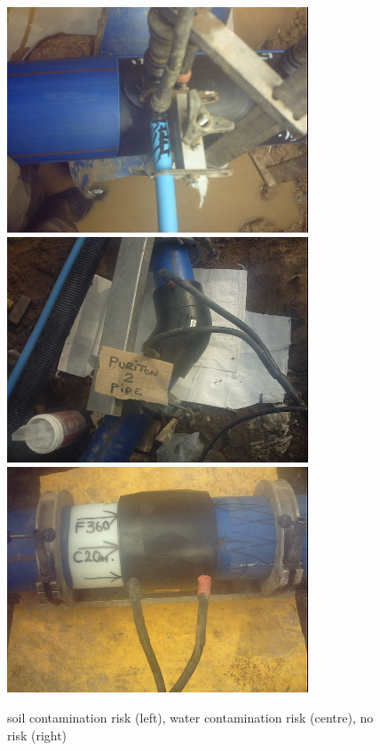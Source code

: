 \documentclass[a4paper,11pt]{article}
\begin{document}
\begin{figure}[h!]
	\centering
	\includegraphics[width=0.8\textwidth,natwidth=610,natheight=642]{images/soilcontam2.jpg}
	\includegraphics[width=0.8\textwidth,natwidth=610,natheight=642]{images/watercontam1.jpg}
	\includegraphics[width=0.8\textwidth,natwidth=610,natheight=642]{images/perfect2.jpg}
	\caption{soil contamination risk (left), water contamination risk (centre), no risk (right)}
\end{figure}
\end{document}
